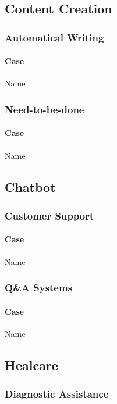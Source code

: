 \documentclass[fleqn,10pt]{SelfArx} %
\begin{document}

\subsection{Content Creation}

\subsubsection{Automatical Writing}
\paragraph{Case} Name %
\subsubsection{Need-to-be-done}
\paragraph{Case} Name %


\subsection{Chatbot}

\subsubsection{Customer Support}
\paragraph{Case} Name %

\subsubsection{Q\&A Systems}
\paragraph{Case} Name %

\subsection{Healcare}

\subsubsection{Diagnostic Assistance}
\end{document}
